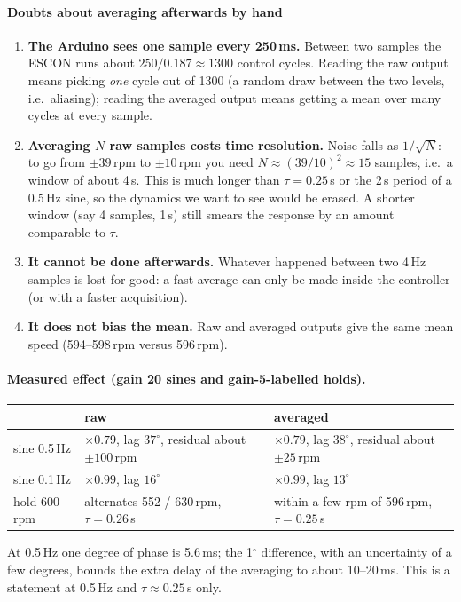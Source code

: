 \documentclass[a4paper,11pt]{article}
\begin{document}
\paragraph{Doubts about averaging afterwards by hand}
\begin{enumerate}
  \item \textbf{The Arduino sees one sample every 250\,ms.} Between two samples the ESCON runs about $250/0.187\approx1300$ control cycles. Reading the raw output means picking \emph{one} cycle out of 1300 (a random draw between the two levels, i.e.\ aliasing); reading the averaged output means getting a mean over many cycles at every sample.
  \item \textbf{Averaging $N$ raw samples costs time resolution.} Noise falls as $1/\sqrt N$: to go from $\pm39$\,rpm to $\pm10$\,rpm you need $N\approx(39/10)^2\approx15$ samples, i.e.\ a window of about 4\,s. This is much longer than $\tau=0.25$\,s or the 2\,s period of a 0.5\,Hz sine, so the dynamics we want to see would be erased. A shorter window (say 4 samples, 1\,s) still smears the response by an amount comparable to $\tau$.
  \item \textbf{It cannot be done afterwards.} Whatever happened between two 4\,Hz samples is lost for good: a fast average can only be made inside the controller (or with a faster acquisition).
  \item \textbf{It does not bias the mean.} Raw and averaged outputs give the same mean speed (594--598\,rpm versus 596\,rpm).
\end{enumerate}

\paragraph{Measured effect (gain 20 sines and gain-5-labelled holds).}
\begin{center}
\begin{tabular}{@{}lll@{}}
\toprule
 & \textbf{raw} & \textbf{averaged} \\
\midrule
sine 0.5\,Hz & $\times0.79$, lag $37^\circ$, residual about $\pm100$\,rpm & $\times0.79$, lag $38^\circ$, residual about $\pm25$\,rpm \\
sine 0.1\,Hz & $\times0.99$, lag $16^\circ$ & $\times0.99$, lag $13^\circ$ \\
hold 600\,rpm & alternates 552 / 630\,rpm, $\tau=0.26$\,s & within a few rpm of 596\,rpm, $\tau=0.25$\,s \\
\bottomrule
\end{tabular}
\end{center}
At 0.5\,Hz one degree of phase is 5.6\,ms; the 1$^\circ$ difference, with an uncertainty of a few degrees, bounds the extra delay of the averaging to about 10--20\,ms. This is a statement at 0.5\,Hz and $\tau\approx0.25$\,s only.
\end{document}
